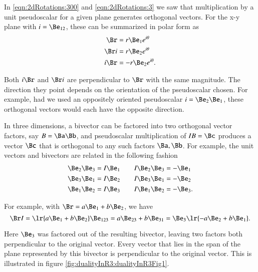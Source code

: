 %
%
In \cref{eqn:2dRotations:300} and \cref{eqn:2dRotations:3} we saw that multiplication by a unit pseudoscalar for a given plane generates orthogonal vectors.  For the x-y plane with \( i = \Be_{12} \), these can be summarized in polar form as
\begin{equation}\label{eqn:dual:1620}
\begin{aligned}
\Br &= r \Be_1 e^{i\theta} \\
\Br i &= r \Be_2 e^{i\theta} \\
i \Br &= -r \Be_2 e^{i\theta}.
\end{aligned}
\end{equation}

Both \( i \Br \) and \( \Br i \) are perpendicular to \( \Br \) with the same magnitude.
The direction they point depends on the orientation of the pseudoscalar chosen.  For example,
had we used an oppositely oriented pseudoscalar \( i = \Be_2 \Be_1 \), these orthogonal vectors would each have the opposite direction.

In three dimensions, a bivector can be factored into two orthogonal vector factors, say \( B = \Ba \Bb \), and 
pseudoscalar multiplication of \( I B = \Bc \) produces a vector \( \Bc \) that is orthogonal to any such factors \( \Ba, \Bb \).
For example, the unit vectors and bivectors are related in the following fashion
\begin{equation}\label{eqn:dual:1580}
\begin{aligned}
\Be_2 \Be_3 &= I \Be_1 \qquad I \Be_2 \Be_3 = -\Be_1 \\
\Be_3 \Be_1 &= I \Be_2 \qquad I \Be_3 \Be_1 = -\Be_2 \\
\Be_1 \Be_2 &= I \Be_3 \qquad I \Be_1 \Be_2 = -\Be_3.
\end{aligned}
\end{equation}

For example, with \( \Br = a \Be_1 + b \Be_2 \), we have
\begin{dmath}\label{eqn:dual:1640}
\Br I
=
\lr{ a \Be_1 + b \Be_2 } \Be_{123}
=
a \Be_{23} + b \Be_{31}
=
\Be_3 \lr{ -a \Be_{2} + b \Be_{1} }.
\end{dmath}

Here \( \Be_3 \) was factored out of the resulting bivector, leaving two factors both perpendicular to the original vector.  Every vector that lies in the span of the plane represented by this bivector is perpendicular to the original vector.
This is illustrated in figure \cref{fig:dualityInR3:dualityInR3Fig1}.


